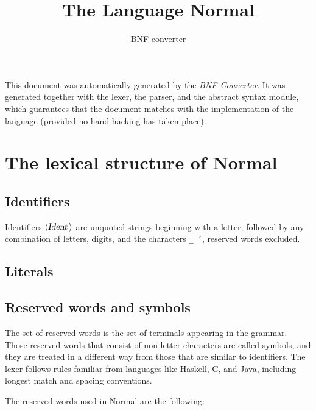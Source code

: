 \documentclass[a4paper,11pt]{article}
\title{The Language Normal}
\author{BNF-converter}
\begin{document}
\maketitle


\newcommand{\emptyP}{\mbox{$\epsilon$}}
\newcommand{\terminal}[1]{\mbox{{\texttt {#1}}}}
\newcommand{\nonterminal}[1]{\mbox{$\langle \mbox{{\sl #1 }} \! \rangle$}}
\newcommand{\arrow}{\mbox{::=}}
\newcommand{\delimit}{\mbox{$|$}}
\newcommand{\reserved}[1]{\mbox{{\texttt {#1}}}}
\newcommand{\literal}[1]{\mbox{{\texttt {#1}}}}
\newcommand{\symb}[1]{\mbox{{\texttt {#1}}}}

This document was automatically generated by the {\em BNF-Converter}.
It was generated together with the lexer, the parser, and the
abstract syntax module, which guarantees that the document
matches with the implementation of the language
(provided no hand-hacking has taken place).

\section*{The lexical structure of Normal}

\subsection*{Identifiers}
Identifiers \nonterminal{Ident} are unquoted strings beginning with a letter,
followed by any combination of letters, digits, and the characters {\tt \_ '},
reserved words excluded.
\subsection*{Literals}

\subsection*{Reserved words and symbols}
The set of reserved words is the set of terminals appearing in the grammar. Those reserved words that consist of non-letter characters are called symbols, and they are treated in a different way from those that are similar to identifiers. The lexer follows rules familiar from languages like Haskell, C, and Java, including longest match and spacing conventions.

The reserved words used in Normal are the following: \\
\end{document}
